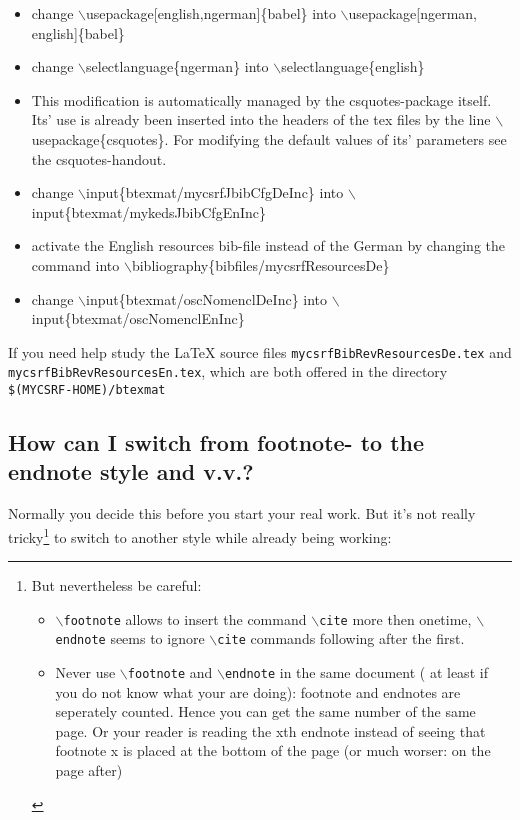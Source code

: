 \documentclass[
  DIV=calc,
  BCOR=5mm,
  11pt,
  headings=small,
  oneside,
  abstract=true,
  toc=bib,
  ngerman,english]{scrartcl}
\begin{document}
\begin{itemize}
  \item change $\backslash$usepackage[english,ngerman]\{babel\} into
  $\backslash$usepackage[ngerman, english]\{babel\}
  \item change $\backslash$selectlanguage\{ngerman\} into 
  $\backslash$selectlanguage\{english\}
  \item This modification is automatically managed by the csquotes-package
  itself. Its' use is already been inserted into the headers of the tex
  files by the line $\backslash$usepackage\{csquotes\}. For modifying the
  default values of its' parameters see the csquotes-handout.
  \item change $\backslash$input\{btexmat/mycsrfJbibCfgDeInc\} into
  $\backslash$input\{btexmat/my\-keds\-Jbib\-CfgEnInc\}
  \item activate the English resources bib-file instead of the German by
  changing the command into $\backslash$bibliography\{bibfiles/mycsrfResourcesDe\}
  \item change $\backslash$input\{btexmat/osc\-Nomencl\-De\-Inc\} into
  $\backslash$input\{btexmat/osc\-Nomencl\-En\-Inc\}
\end{itemize}

If you need help study the LaTeX source files
\texttt{mycsrfBibRevResourcesDe.tex} and
\texttt{mycsrfBibRevResourcesEn.tex}, which are both offered in the directory
\texttt{\$(MYCSRF-HOME)/btexmat}

\subsection{How can I switch from footnote- to the endnote style and v.v.?}

Normally you decide this before you start your real work. But it's not
really tricky\footnote{
But nevertheless be careful: 
\begin{itemize}
  \item \texttt{$\backslash$footnote} allows to insert the command
  \texttt{$\backslash$cite} more then onetime, \texttt{$\backslash$endnote}
  seems to ignore \texttt{$\backslash$cite} commands following after the first.
  \item Never use \texttt{$\backslash$footnote} and \texttt{$\backslash$endnote}
  in the same document ( at least if you do not know what your are
  doing): footnote and endnotes are seperately counted. Hence you can get the
  same number of the same page. Or your reader is reading the xth endnote
  instead of seeing that footnote x is placed at the bottom of the page (or
  much worser: on the page after)
\end{itemize}} to switch to another style while already being working:
\end{document}

